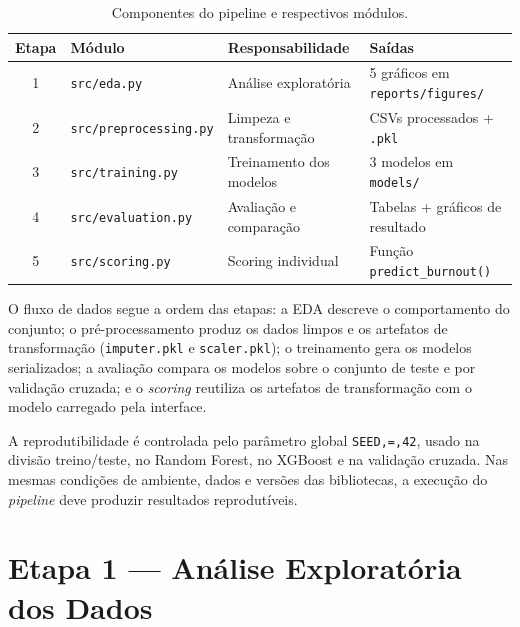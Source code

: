 \documentclass[conference]{IEEEtran}
\newcommand{\fonte}[1][elaborado pelos autores.]{%
\par\vspace{1pt}{\footnotesize\centering Fonte: #1\par}}
\begin{document}
\begin{table}[!t]
\centering
\caption{Componentes do pipeline e respectivos módulos.}
\label{tab:pipeline}
\begin{tabular}{clll}
\toprule
\textbf{Etapa} & \textbf{Módulo}                         & \textbf{Responsabilidade} & \textbf{Saídas} \\
\midrule
1              & \texttt{src/eda.py}
& Análise exploratória
& 5 gráficos em \texttt{reports/figures/}                                               \\
2              & \texttt{src/preprocessing.py}
& Limpeza e transformação
& CSVs processados + \texttt{.pkl}                                                      \\
3              & \texttt{src/training.py}
& Treinamento dos modelos
& 3 modelos em \texttt{models/}                                                         \\
4              & \texttt{src/evaluation.py}
& Avaliação e comparação
& Tabelas + gráficos de resultado                                                       \\
5              & \texttt{src/scoring.py}
& Scoring individual
& Função \texttt{predict_burnout()}                                                    \\
\bottomrule
\end{tabular}
\fonte
\end{table}

O fluxo de dados segue a ordem das etapas: a EDA descreve o comportamento
do conjunto; o pré-processamento produz os dados limpos e os artefatos de
transformação (\texttt{imputer.pkl} e \texttt{scaler.pkl}); o treinamento
gera os modelos serializados; a avaliação compara os modelos sobre o
conjunto de teste e por validação cruzada; e o \textit{scoring} reutiliza
os artefatos de transformação com o modelo carregado pela interface.

A reprodutibilidade é controlada pelo parâmetro global \texttt{SEED,=,42},
usado na divisão treino/teste, no Random Forest, no XGBoost e na validação
cruzada. Nas mesmas condições de ambiente, dados e versões das bibliotecas,
a execução do \textit{pipeline} deve produzir resultados reprodutíveis.

\section{Etapa 1 — Análise Exploratória dos Dados}
\label{sec:eda}
\end{document}
